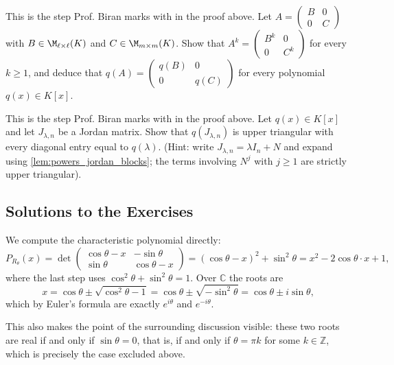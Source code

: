 \begin{exercise}
\label{exc:powers_of_block_diagonal}
This is the step Prof. Biran marks with  in the proof above. Let $A = \left(\begin{smallmatrix} B & 0 \\ 0 & C \end{smallmatrix}\right)$ with $B \in \M_{\ell \times \ell}(K)$ and $C \in \M_{m \times m}(K)$. Show that $A^k = \left(\begin{smallmatrix} B^k & 0 \\ 0 & C^k \end{smallmatrix}\right)$ for every $k \ge 1$, and deduce that $q(A) = \left(\begin{smallmatrix} q(B) & 0 \\ 0 & q(C) \end{smallmatrix}\right)$ for every polynomial $q(x) \in K[x]$.
\end{exercise}

\begin{exercise}
\label{exc:polynomial_of_jordan_block}
This is the step Prof. Biran marks with  in the proof above. Let $q(x) \in K[x]$ and let $J_{\lambda, n}$ be a Jordan matrix. Show that $q(J_{\lambda, n})$ is upper triangular with every diagonal entry equal to $q(\lambda)$. (Hint: write $J_{\lambda,n} = \lambda I_n + N$ and expand using \cref{lem:powers_jordan_blocks}; the terms involving $N^j$ with $j \ge 1$ are strictly upper triangular).
\end{exercise}
\subsection{Solutions to the Exercises}
\label{sec:solutions_jordan_a}

\begin{exercisesolution}
\label{sol:rotation_complex_eigenvalues}
We compute the characteristic polynomial directly:
\[
    P_{R_\theta}(x) = \det \begin{pmatrix} \cos\theta - x & -\sin\theta \\ \sin\theta & \cos\theta - x \end{pmatrix} = (\cos\theta - x)^2 + \sin^2\theta = x^2 - 2\cos\theta \cdot x + 1,
\]
where the last step uses $\cos^2\theta + \sin^2\theta = 1$. Over $\mathbb{C}$ the roots are
\[
    x = \cos\theta \pm \sqrt{\cos^2\theta - 1} = \cos\theta \pm \sqrt{-\sin^2\theta} = \cos\theta \pm i \sin\theta,
\]
which by Euler's formula are exactly $e^{i\theta}$ and $e^{-i\theta}$.

This also makes the point of the surrounding discussion visible: these two roots are real if and only if $\sin\theta = 0$, that is, if and only if $\theta = \pi k$ for some $k \in \mathbb{Z}$, which is precisely the case excluded above.
\end{exercisesolution}

